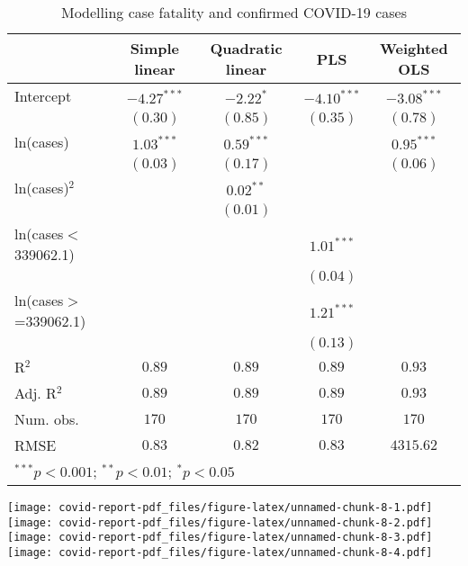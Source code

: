 \documentclass[
]{article}
\begin{document}
\begin{table}[h]
\begin{center}
\begin{small}
\begin{tabular}{l c c c c}
\hline
 & Simple linear & Quadratic linear & PLS & Weighted OLS \\
\hline
Intercept             & $-4.27^{***}$ & $-2.22^{*}$  & $-4.10^{***}$ & $-3.08^{***}$ \\
                      & $(0.30)$      & $(0.85)$     & $(0.35)$      & $(0.78)$      \\
ln(cases)             & $1.03^{***}$  & $0.59^{***}$ &               & $0.95^{***}$  \\
                      & $(0.03)$      & $(0.17)$     &               & $(0.06)$      \\
ln(cases)$^2$         &               & $0.02^{**}$  &               &               \\
                      &               & $(0.01)$     &               &               \\
ln(cases$<$339062.1)  &               &              & $1.01^{***}$  &               \\
                      &               &              & $(0.04)$      &               \\
ln(cases$>$=339062.1) &               &              & $1.21^{***}$  &               \\
                      &               &              & $(0.13)$      &               \\
\hline
R$^2$                 & $0.89$        & $0.89$       & $0.89$        & $0.93$        \\
Adj. R$^2$            & $0.89$        & $0.89$       & $0.89$        & $0.93$        \\
Num. obs.             & $170$         & $170$        & $170$         & $170$         \\
RMSE                  & $0.83$        & $0.82$       & $0.83$        & $4315.62$     \\
\hline
\multicolumn{5}{l}{\tiny{$^{***}p<0.001$; $^{**}p<0.01$; $^{*}p<0.05$}}
\end{tabular}
\end{small}
\caption{Modelling case fatality and confirmed COVID-19 cases}
\label{table:coefficients}
\end{center}
\end{table}
\newpage

\texttt{[image: covid-report-pdf\_files/figure-latex/unnamed-chunk-8-1.pdf]}
\texttt{[image: covid-report-pdf\_files/figure-latex/unnamed-chunk-8-2.pdf]}
\texttt{[image: covid-report-pdf\_files/figure-latex/unnamed-chunk-8-3.pdf]}
\texttt{[image: covid-report-pdf\_files/figure-latex/unnamed-chunk-8-4.pdf]}
\end{document}
